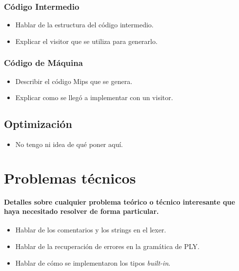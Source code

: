 \documentclass[11pt]{scrartcl} %
\begin{document}
\subsubsection{Código Intermedio}

\begin{itemize}
	\item Hablar de la estructura del código intermedio.
	\item Explicar el visitor que se utiliza para generarlo.
\end{itemize}

\subsubsection{Código de Máquina}

\begin{itemize}
	\item Describir el código Mips que se genera.
	\item Explicar como se llegó a implementar con un visitor.
\end{itemize}

\subsection{Optimización}

\begin{itemize}
	\item No tengo ni idea de qué poner aquí.
\end{itemize}


\section{Problemas técnicos}

\paragraph{Detalles sobre cualquier problema teórico o técnico interesante que haya necesitado resolver de forma particular.}	

\begin{itemize}
	\item Hablar de los comentarios y los strings en el lexer.
	\item Hablar de la recuperación de errores en la gramática de PLY.
	\item Hablar de cómo se implementaron los tipos \textit{built-in}.
\end{itemize}

\end{document}
